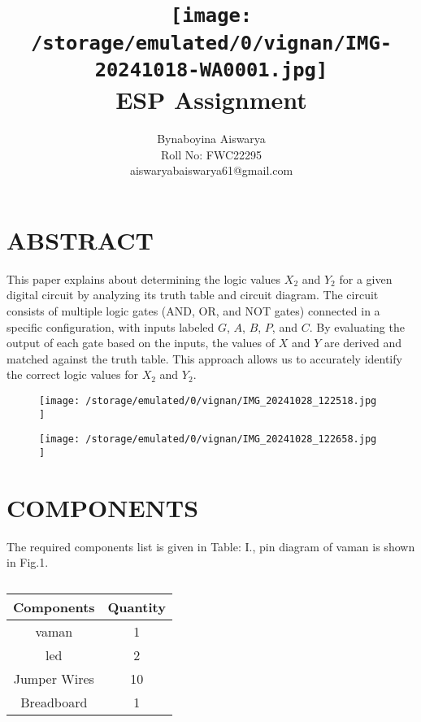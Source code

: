 \documentclass[conference]{IEEEtran}
\title{
\vspace{1cm}
{\texttt{[image:  /storage/emulated/0/vignan/IMG-20241018-WA0001.jpg]} \\ ESP Assignment}}
\author{Bynaboyina Aiswarya \\ Roll No: FWC22295 \\ aiswaryabaiswarya61@gmail.com}
\begin{document}
\maketitle
 \section{ABSTRACT}

This paper explains about determining the logic values \( X_2 \) and \( Y_2 \) for a given digital circuit by analyzing its truth table and circuit diagram. The circuit consists of multiple logic gates (AND, OR, and NOT gates) connected in a specific configuration, with inputs labeled \( G \), \( A \), \( B \), \( P \), and \( C \). By evaluating the output of each gate based on the inputs, the values of \( X \) and \( Y \) are derived and matched against the truth table. This approach allows us to accurately identify the correct logic values for \( X_2 \) and \( Y_2 \).


\begin{figure}[h]                         
\centering                                
\texttt{[image:  /storage/emulated/0/vignan/IMG\_20241028\_122518.jpg ]}                               
\caption{\label{fig-1:Gates}}             
\end{figure}

\begin{figure}[h]                       
\centering                               
\texttt{[image:  /storage/emulated/0/vignan/IMG\_20241028\_122658.jpg ]}                                
\caption{\label{fig-2:Gates}}             
\end{figure}


\section{COMPONENTS} 

The required components list is given in Table: I., pin diagram of vaman is shown in Fig.1.
\vspace{0.3cm}
 \begin{table} [htbp]
\centering
\begin{tabular}{| c | c |} \hline
Components  & Quantity \\\hline
vaman   & 1 \\ \hline
led  & 2 \\ \hline
Jumper Wires   & 10 \\ \hline
Breadboard & 1 \\ 
\hline
\end{tabular}
\vspace{0.1cm}
\caption{\label{tab:widgets}}
\end{table}
\end{document}
